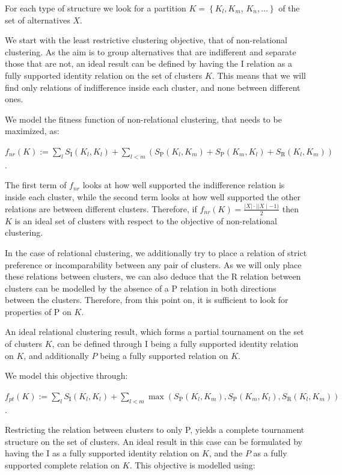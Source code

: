 \documentclass[10pt]{article}
\begin{document}
For each type of structure we look for a partition $K=\left\{K_{l}, K_{m}\right.$, $\left.K_{n}, \ldots\right\}$ of the set of alternatives $X$.

We start with the least restrictive clustering objective, that of non-relational clustering. As the aim is to group alternatives that are indifferent and separate those that are not, an ideal result can be defined by having the I relation as a fully supported identity relation on the set of clusters $K$. This means that we will find only relations of indifference inside each cluster, and none between different ones.

We model the fitness function of non-relational clustering, that needs to be maximized, as:

$f_{n r}(K):=\sum_{l} S_{\mathrm{I}}\left(K_{l}, K_{l}\right)+\sum_{l<m}\left(S_{\mathrm{P}}\left(K_{l}, K_{m}\right)+S_{\mathrm{P}}\left(K_{m}, K_{l}\right)+S_{\mathrm{R}}\left(K_{l}, K_{m}\right)\right)$.

The first term of $f_{n r}$ looks at how well supported the indifference relation is inside each cluster, while the second term looks at how well supported the other relations are between different clusters. Therefore, if $f_{n r}(K)=\frac{|X| \cdot|| X \mid-1)}{2}$ then $K$ is an ideal set of clusters with respect to the objective of non-relational clustering.

In the case of relational clustering, we additionally try to place a relation of strict preference or incomparability between any pair of clusters. As we will only place these relations between clusters, we can also deduce that the $\mathrm{R}$ relation between clusters can be modelled by the absence of a $\mathrm{P}$ relation in both directions between the clusters. Therefore, from this point on, it is sufficient to look for properties of $\mathrm{P}$ on $K$.

An ideal relational clustering result, which forms a partial tournament on the set of clusters $K$, can be defined through I being a fully supported identity relation on $K$, and additionally $P$ being a fully supported relation on $K$.

We model this objective through:

$f_{p t}(K):=\sum_{l} S_{\mathrm{I}}\left(K_{l}, K_{l}\right)+\sum_{l<m} \max \left(S_{\mathrm{P}}\left(K_{l}, K_{m}\right), S_{\mathrm{P}}\left(K_{m}, K_{l}\right), S_{\mathrm{R}}\left(K_{l}, K_{m}\right)\right)$.

Restricting the relation between clusters to only P, yields a complete tournament structure on the set of clusters. An ideal result in this case can be formulated by having the I as a fully supported identity relation on $K$, and the $P$ as a fully supported complete relation on $K$. This objective is modelled using:
\end{document}
